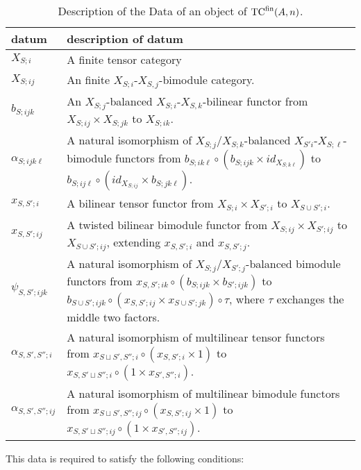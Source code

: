 \documentclass{amsart}
\begin{document}
\begin{table}[ht]
	\caption{Description of the Data of an object of ${\mathrm{TC}^{\text{fin}}}(A,n)$.}	
	\begin{tabular}{l p{11cm}}
		datum & description of datum \\ \hline
		$X_{S;i}$ & A finite tensor category \\
		$X_{S;ij}$ & An finite $X_{S;i}$-$X_{S,j}$-bimodule category. \\
		$b_{S; ijk}$ & An $X_{S;j}$-balanced $X_{S;i}$-$X_{S,k}$-bilinear functor from $X_{S;ij}\times X_{S;jk}$ to $X_{S;ik}$. \\
		$\alpha_{S;ijk \ell}$  & A natural isomorphism of $X_{S;j}$/$X_{S;k}$-balanced $X_{S'i}$-$X_{S;\ell}$-bimodule functors from $b_{S;i k \ell} \circ (b_{S;ijk} \times id_{X_{S;k\ell}})$ to $b_{S;ij \ell} \circ (id_{X_{S;ij}} \times b_{S;jk\ell})$. \\ \hline
		$x_{S, S';i}$ & A bilinear tensor functor from $X_{S;i} \times X_{S';i}$ to $X_{S \cup S'; i}$. \\
		$x_{S, S';ij}$ & A twisted bilinear bimodule functor from $X_{S;ij} \times X_{S';ij}$ to $X_{S \cup S'; ij}$, extending $x_{S, S';i}$ and $x_{S, S';j}$. \\
		$\psi_{S, S'; i j k}$ & A natural isomorphism of $X_{S;j} / X_{S';j}$-balanced bimodule functors from $x_{S,S'; ik} \circ (b_{S; ijk} \times b_{S';ijk})$ to $b_{S \cup S'; ijk} \circ (x_{S,S';ij} \times x_{S \cup S'; jk}) \circ  \tau $, where $\tau$ exchanges the middle two factors.  \\ \hline
		$\alpha_{S, S', S'';i}$ & A natural isomorphism of multilinear tensor functors from
		$x_{S \sqcup S', S'';i}\circ (x_{S,S';i} \times 1)$  to 
		$x_{S, S' \sqcup S'';i} \circ (1 \times x_{S', S'';i})$. \\
		$\alpha_{S, S', S'';ij}$ & A natural isomorphism of multilinear bimodule functors from
		$x_{S \sqcup S', S'';ij}\circ (x_{S,S';ij} \times 1)$  to 
		$x_{S, S' \sqcup S'';ij} \circ (1 \times x_{S', S'';ij})$. \\
	\end{tabular}
	\label{Table:ObjectOfTC2}
\end{table}
This data is required to satisfy the following conditions: \\
\end{document}
